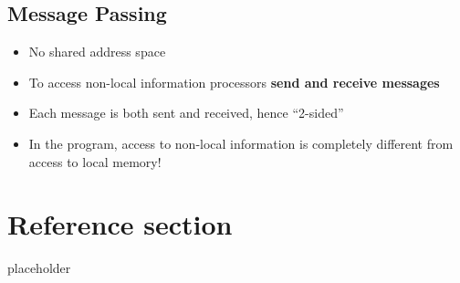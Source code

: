 \documentclass{article}
\begin{document}
\subsection{Message Passing}
\begin{itemize}
  \item No shared address space 
  \item To access non-local information processors \textbf{send and receive messages}
  \item Each message is both sent and received, hence “2-sided” 
  \item In the program, access to non-local information is completely different from access to local memory!
\end{itemize}

\pagebreak
\section*{Reference section} \label{sec:reference}
\begin{description}
	\item[placeholder] \hfill \\
\end{description}
\end{document}
